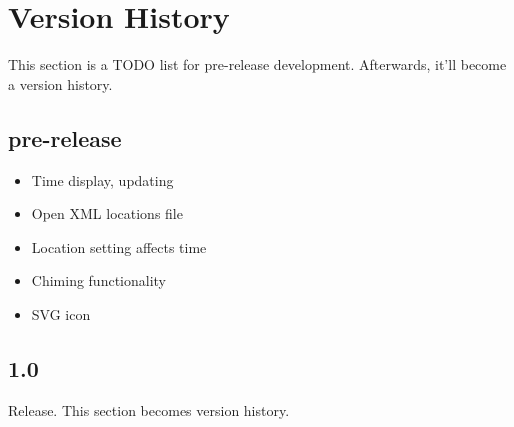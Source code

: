 \section{Version History}

This section is a TODO list for pre-release development. Afterwards, it'll become a version history.

\subsection{pre-release}
\begin{itemize}
    \item Time display, updating
    \item Open XML locations file
    \item Location setting affects time
    \item Chiming functionality
    \item SVG icon
\end{itemize}
\subsection{1.0}

Release. This section becomes version history.

